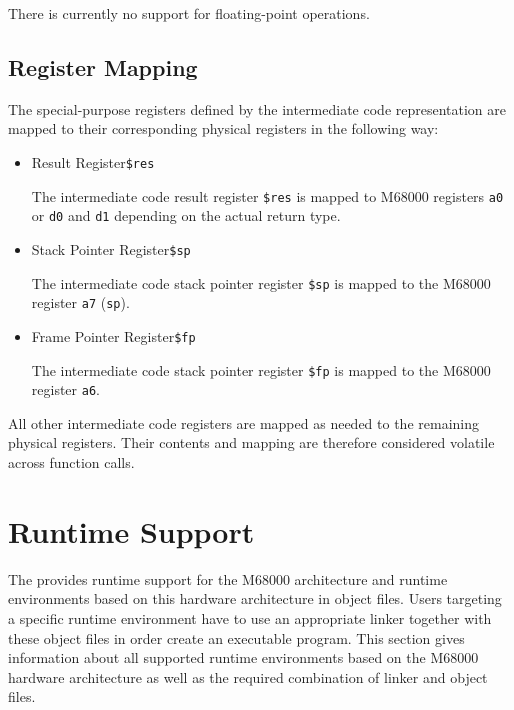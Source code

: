 There is currently no support for floating-point operations.

\subsection{Register Mapping}

The special-purpose registers defined by the intermediate code representation are mapped to their corresponding physical registers in the following way:

\begin{itemize}

\item Result Register\alignright\texttt{\$res}\nopagebreak

The intermediate code result register \texttt{\$res} is mapped to M68000 registers \texttt{a0} or \texttt{d0} and \texttt{d1} depending on the actual return type.

\item Stack Pointer Register\alignright\texttt{\$sp}\nopagebreak

The intermediate code stack pointer register \texttt{\$sp} is mapped to the M68000 register \texttt{a7} (\texttt{sp}).

\item Frame Pointer Register\alignright\texttt{\$fp}\nopagebreak

The intermediate code stack pointer register \texttt{\$fp} is mapped to the M68000 register \texttt{a6}.

\end{itemize}

All other intermediate code registers are mapped as needed to the remaining physical registers.
Their contents and mapping are therefore considered volatile across function calls.

\section{Runtime Support}

The \ecs{} provides runtime support for the M68000 architecture and runtime environments based on this hardware architecture in object files.
Users targeting a specific runtime environment have to use an appropriate linker together with these object files in order create an executable program.
This section gives information about all supported runtime environments based on the M68000 hardware architecture as well as the required combination of linker and object files.

